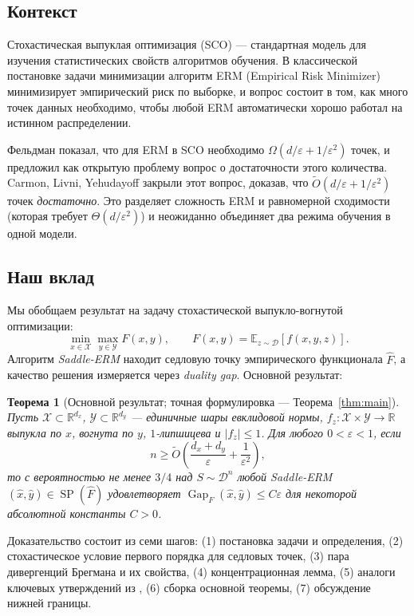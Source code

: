 \documentclass[12pt,a4paper]{article}
\theoremstyle{plain}
\newtheorem{theorem}{Теорема}[section]
\theoremstyle{definition}
\DeclareMathOperator{\Gap}{Gap}
\DeclareMathOperator{\SP}{SP}
\newcommand{\E}{\mathbb{E}}
\newcommand{\R}{\mathbb{R}}
\newcommand{\cX}{\mathcal{X}}
\newcommand{\cY}{\mathcal{Y}}
\newcommand{\cD}{\mathcal{D}}
\newcommand{\hatF}{\hat{F}}
\begin{document}
\subsection{Контекст}

Стохастическая выпуклая оптимизация (SCO) --- стандартная модель для изучения статистических свойств алгоритмов обучения. В классической постановке задачи минимизации алгоритм ERM (Empirical Risk Minimizer) минимизирует эмпирический риск по выборке, и вопрос состоит в том, как много точек данных необходимо, чтобы любой ERM автоматически хорошо работал на истинном распределении.

Фельдман \cite{Feldman2016} показал, что для ERM в SCO необходимо $\Omega(d/\varepsilon + 1/\varepsilon^2)$ точек, и предложил как открытую проблему вопрос о достаточности этого количества. Carmon, Livni, Yehudayoff \cite{CLY2023} закрыли этот вопрос, доказав, что $\tilde{O}(d/\varepsilon + 1/\varepsilon^2)$ точек \emph{достаточно}. Это разделяет сложность ERM и равномерной сходимости (которая требует $\Theta(d/\varepsilon^2)$) и неожиданно объединяет два режима обучения в одной модели.

\subsection{Наш вклад}

Мы обобщаем результат \cite{CLY2023} на задачу стохастической выпукло-вогнутой оптимизации:
\[
    \min_{x\in\cX}\max_{y\in\cY} F(x,y), \qquad F(x,y) = \E_{z\sim\cD}[f(x,y,z)].
\]
Алгоритм \emph{Saddle-ERM} находит седловую точку эмпирического функционала $\hatF$, а качество решения измеряется через \emph{duality gap}. Основной результат:

\begin{theorem}[Основной результат; точная формулировка --- Теорема~\ref{thm:main}]
\label{thm:intro}
Пусть $\cX\subset\R^{d_x}$, $\cY\subset\R^{d_y}$ --- единичные шары евклидовой нормы, $f_z:\cX\times\cY\to\R$ выпукла по $x$, вогнута по $y$, $1$-липшицева и $|f_z|\le 1$. Для любого $0<\varepsilon<1$, если
\[
    n \ge \tilde{O}\!\left(\frac{d_x+d_y}{\varepsilon}+\frac{1}{\varepsilon^2}\right),
\]
то с вероятностью не менее $3/4$ над $S\sim\cD^n$ любой Saddle-ERM $(\hat{x},\hat{y})\in\SP(\hatF)$ удовлетворяет $\Gap_F(\hat{x},\hat{y})\le C\varepsilon$ для некоторой абсолютной константы $C>0$.
\end{theorem}

Доказательство состоит из семи шагов: (1) постановка задачи и определения, (2) стохастическое условие первого порядка для седловых точек, (3) пара дивергенций Брегмана и их свойства, (4) концентрационная лемма, (5) аналоги ключевых утверждений из \cite{CLY2023}, (6) сборка основной теоремы, (7) обсуждение нижней границы.
\end{document}
